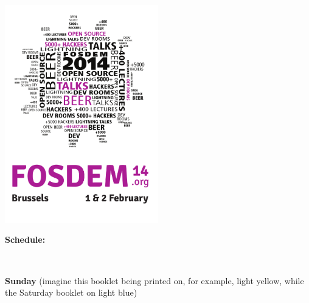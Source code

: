 \documentclass[a4paper,10pt]{article}
\begin{document}
\pagestyle{empty}
\label{cover}
\begin{center}
\includegraphics[width=0.5\textwidth]{artwork/cover}

\vfill
{\Huge \bf Schedule: }

$ $

{\Huge \bf Sunday }
\vfill
(imagine this booklet being printed on, for example, light yellow, while the Saturday booklet on light blue)

\end{center}



{%
\fontsize{10}{7.8}\selectfont%
\renewcommand{\arraystretch}{0.9}%
%
%
}



\end{document}

